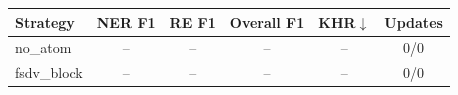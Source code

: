 \begin{tabular}{lccccc}
\toprule
Strategy & NER F1 & RE F1 & Overall F1 & KHR$\downarrow$ & Updates \\
\midrule
no_atom & -- & -- & -- & -- & 0/0 \\
fsdv_block & -- & -- & -- & -- & 0/0 \\
\bottomrule
\end{tabular}
